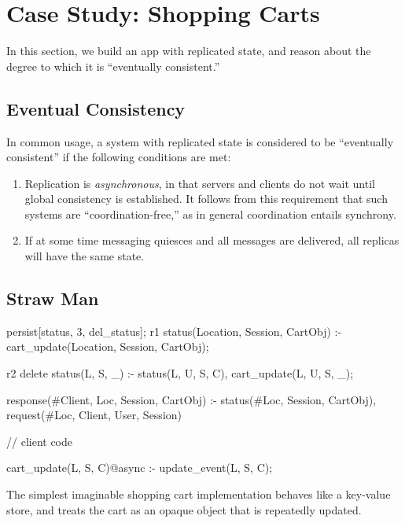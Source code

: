 \section{Case Study: Shopping Carts}

In this section, we build an app with replicated state, and reason about the degree to which
it is ``eventually consistent.''

\subsection{Eventual Consistency}

In common usage, a system with replicated state is considered to be ``eventually consistent'' 
if the following conditions are met:

\begin{enumerate}
\item Replication is \emph{asynchronous}, in that servers and clients do not wait until global consistency is established.  It follows from this requirement that such systems are ``coordination-free,'' as in general coordination entails synchrony. 
\item If at some time messaging quiesces and all messages are delivered, all replicas will have the same state.
\end{enumerate}

\subsection{Straw Man}

\begin{Dedalus}
persist[status, 3, del_status];
r1
status(Location, Session, CartObj) :-
    cart_update(Location,  Session, CartObj);
    
r2
delete status(L, S, _) :-
    status(L, U, S, C), cart_update(L, U, S, _);

response(#Client, Loc, Session, CartObj) :-
    status(#Loc, Session, CartObj),
    request(#Loc, Client, User, Session)

// client code

cart_update(L, S, C)@async :- 
    update_event(L, S, C);

\end{Dedalus}

The simplest imaginable shopping cart implementation behaves like a key-value store,
and treats the cart as an opaque object that is repeatedly updated.  

